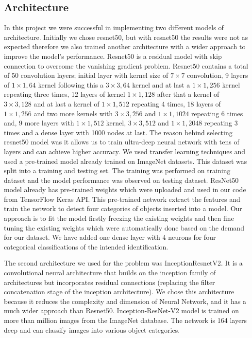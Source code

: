 \documentclass{report}
\begin{document}
\subsection{Architecture }
In this project we were successful in implementing two different models of architecture. Initially we chose resnet50, but with resnet50 the results were not as expected therefore we also trained another architecture with a wider approach to improve the model's performance. Resnet50 is a residual model with skip connection to overcome the vanishing gradient problem. Resnet50 contains a total of 50 convolution layers;  initial layer with kernel size of  $7\times7$ convolution, 9 layers of $1 \times 1,64$ kernel following this a $3 \times 3,64$ kernel and at last a $1 \times 1,256$ kernel repeating three times, 12 layers of kernel $1 \times 1,128$ after that a kernel of $3 \times 3,128$ and at last a kernel of $1 \times 1,512$ repeating 4 times, 18 layers of $1 \times 1,256$ and two more kernels with $3 \times 3,256$ and $1 \times 1,1024$ repeating 6 times and, 9 more layers with $1 \times 1,512$ kernel, $3 \times 3,512$ and $1 \times 1,2048$ repeating 3 times and a dense layer with 1000 nodes at last. The reason behind selecting resnet50 model was it allows us to train ultra-deep neural network with tens of layers and can achieve higher accuracy. We used transfer learning techniques and used a pre-trained model already trained on ImageNet datasets. This dataset was split into a training and testing set. The training was performed on training dataset and the model performance was observed on testing dataset. ResNet50 model already has pre-trained weights which were uploaded and used in our code from TensorFlow Keras API. This pre-trained network extract the features and train the network to detect four categories of objects inserted into a model. Our approach is to fit the model firstly freezing the existing weights and then fine tuning the existing weights which were automatically done based on the demand for our dataset. We have added one dense layer with 4 neurons for four categorical classifications of the intended identification.  

The second architecture we used for the problem was InceptionResnetV2. It is a convolutional neural architecture that builds on the inception family of architectures but incorporates residual connections (replacing the filter concatenation stage of the inception architecture). We chose this architecture because it reduces the complexity and dimension of Neural Network, and it has a much wider approach than Resnet50. Inception-ResNet-V2 model is trained on more than million images from the ImageNet database. The network is 164 layers deep and can classify images into various object categories.  
\end{document}
